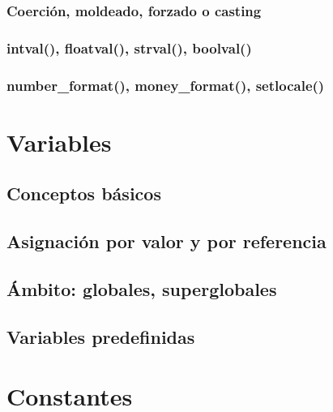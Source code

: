 \documentclass[a4paper,11pt,spanish]{sphinxmanual}
\begin{document}
\subsubsection{Coerción, moldeado, forzado o casting}
\label{\detokenize{php:coercion-moldeado-forzado-o-casting}}

\subsubsection{intval(), floatval(), strval(), boolval()}
\label{\detokenize{php:intval-floatval-strval-boolval}}

\subsubsection{number\_format(), money\_format(), setlocale()}
\label{\detokenize{php:number-format-money-format-setlocale}}

\section{Variables}
\label{\detokenize{php:variables}}

\subsection{Conceptos básicos}
\label{\detokenize{php:conceptos-basicos}}

\subsection{Asignación por valor y por referencia}
\label{\detokenize{php:asignacion-por-valor-y-por-referencia}}

\subsection{Ámbito: globales, superglobales}
\label{\detokenize{php:ambito-globales-superglobales}}

\subsection{Variables predefinidas}
\label{\detokenize{php:variables-predefinidas}}

\section{Constantes}
\label{\detokenize{php:constantes}}
\end{document}
